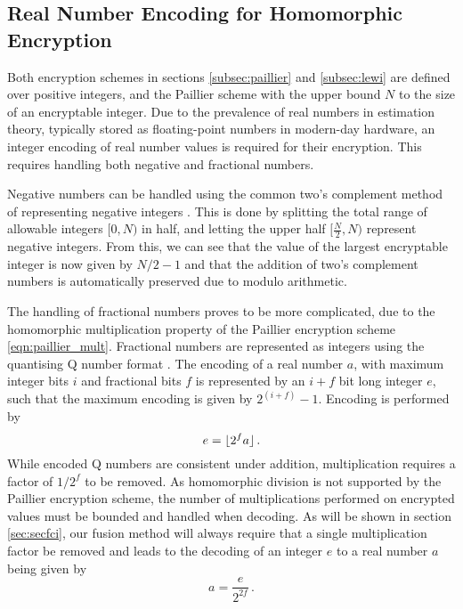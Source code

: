 \documentclass[letterpaper, 10 pt, conference]{ieeeconf}  %
\begin{document}
\subsection{Real Number Encoding for Homomorphic Encryption}
Both encryption schemes in sections \ref{subsec:paillier} and \ref{subsec:lewi} are defined over positive integers, and the Paillier scheme with the upper bound $N$ to the size of an encryptable integer. Due to the prevalence of real numbers in estimation theory, typically stored as floating-point numbers in modern-day hardware, an integer encoding of real number values is required for their encryption. This requires handling both negative and fractional numbers. 

Negative numbers can be handled using the common two's complement method of representing negative integers \cite{liljaDesigningDigitalComputer2004}. This is done by splitting the total range of allowable integers $[0, N)$ in half, and letting the upper half $[\frac{N}{2}, N)$ represent negative integers. From this, we can see that the value of the largest encryptable integer is now given by $N/2-1$ and that the addition of two's complement numbers is automatically preserved due to modulo arithmetic.
   
The handling of fractional numbers proves to be more complicated, due to the homomorphic multiplication property of the Paillier encryption scheme \eqref{eqn:paillier_mult}. Fractional numbers are represented as integers using the quantising Q number format \cite{oberstarFixedPointRepresentationFractional2007}. The encoding of a real number $a$, with maximum integer bits $i$ and fractional bits $f$ is represented by an $i+f$ bit long integer $e$, such that the maximum encoding is given by $2^{(i+f)}-1$. Encoding is performed by
\begin{equation}
   e = \lfloor{2^f a}\rfloor\,. \label{eqn:qmn}
\end{equation}
While encoded Q numbers are consistent under addition, multiplication requires a factor of $1/2^f$ to be removed. As homomorphic division is not supported by the Paillier encryption scheme, the number of multiplications performed on encrypted values must be bounded and handled when decoding. As will be shown in section \ref{sec:secfci}, our fusion method will always require that a single multiplication factor be removed and leads to the decoding of an integer $e$ to a real number $a$ being given by
\begin{equation}
   a = \frac{e}{2^{2f}}\,. \label{eqn:qmn_mult_decode}
\end{equation}
\end{document}
